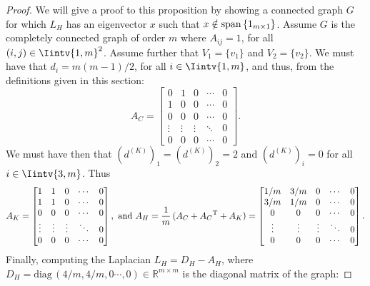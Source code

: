 \begin{proof}
   We will give a proof to this proposition by showing a connected graph $G$ for which $L_H$ has an eigenvector $x$ such that $x \notin \mathcal {\operatorname{span\,}} \{ 1_{m \times 1} \}$. 
   Assume $G$ is the completely connected graph of order $m$ where $A_{ij} = 1$, for all $(i,j) \in \Iintv{1,m}^2$.
   Assume further that $V_1 = \{ v_1 \}$ and $V_2 = \{ v_2 \}$.
   We must have that $d_i = m(m-1)/2$, for all $i \in \Iintv{1,m}$, and thus, from the definitions given in this section:
   \begin{equation*}
      A_C = 
      \begin{bmatrix}
         0 & 1 & 0 & \cdots & 0 \\
         1 & 0 & 0 & \cdots & 0 \\
         0 & 0 & 0 & \cdots & 0 \\
         \vdots & \vdots & \vdots & \ddots & 0 \\
         0 & 0 & 0 & \cdots & 0 
      \end{bmatrix}.
   \end{equation*}
   We must have then that $\left( d^{(K)} \right) _1 = \left( d^{(K)} \right)_2 = 2$ and $\left( d^{(K)} \right)_i = 0$ for all $i \in \Iintv{3,m}$. Thus
   \begin{equation*}
      A_K =
      \begin{bmatrix}
         1 & 1 & 0 & \cdots & 0 \\
         1 & 1 & 0 & \cdots & 0 \\
         0 & 0 & 0 & \cdots & 0 \\
         \vdots & \vdots & \vdots & \ddots & 0 \\
         0 & 0 & 0 & \cdots & 0 
      \end{bmatrix},
      \text{ and }
      A_H = \frac{1}{m} \, (A_C + {A_C}^{\rm T} + A_K) = 
      \begin{bmatrix}
         1/m & 3/m & 0 & \cdots & 0 \\
         3/m & 1/m & 0 & \cdots & 0 \\
         0 & 0 & 0 & \cdots & 0 \\
         \vdots & \vdots & \vdots & \ddots & 0 \\
         0 & 0 & 0 & \cdots & 0 
      \end{bmatrix}.
   \end{equation*}
   Finally, computing the Laplacian $L_H = D_H - A_H$, where $D_H = \text{diag} \,(4/m, 4/m, 0 \cdots, 0) \in \mathbb R^{m \times m}$ is the diagonal matrix of the graph:

\end{proof}

